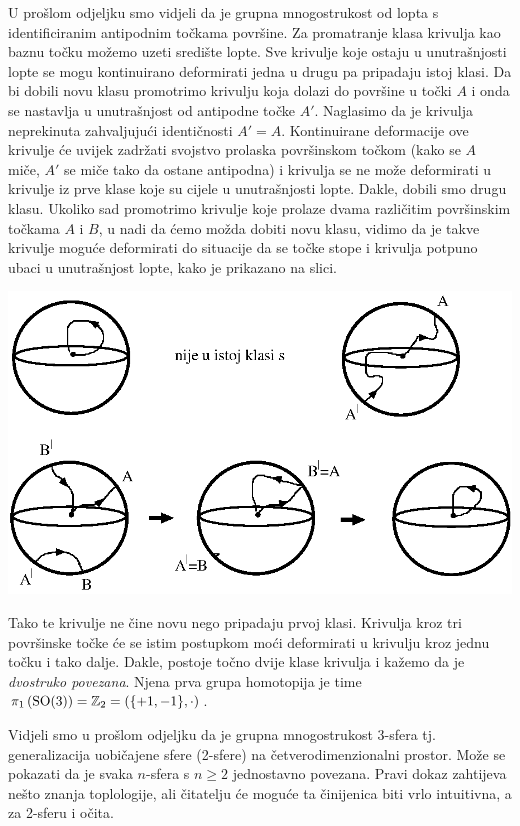 \begin{primjer}[\SO{3}]

U prošlom odjeljku smo vidjeli da je grupna mnogostrukost od 
lopta s identificiranim antipodnim točkama površine.
Za promatranje
klasa krivulja kao baznu točku možemo uzeti središte lopte. Sve krivulje
koje ostaju u unutrašnjosti lopte se mogu kontinuirano deformirati jedna
u drugu pa pripadaju istoj klasi. Da bi dobili novu klasu promotrimo
krivulju koja dolazi do površine u točki $A$ i onda se nastavlja u unutrašnjost
od antipodne točke $A'$. Naglasimo da je krivulja neprekinuta zahvaljujući
identičnosti $A'=A$.
Kontinuirane deformacije ove krivulje će uvijek
zadržati svojstvo prolaska površinskom točkom (kako se $A$ miče, $A'$ se
miče tako da ostane antipodna) i krivulja se ne može deformirati u krivulje
iz prve klase koje su cijele u unutrašnjosti lopte. Dakle, dobili smo
drugu klasu. Ukoliko sad promotrimo krivulje koje prolaze dvama različitim površinskim
točkama $A$ i $B$, u nadi da ćemo možda dobiti novu klasu, vidimo da je takve
krivulje moguće deformirati do situacije da se točke stope i krivulja potpuno
ubaci u unutrašnjost lopte, kako je prikazano na slici.

\centerline{\includegraphics[scale=0.8]{pics/dvostruka_povezanost_so3.eps}}

Tako te krivulje ne čine novu nego pripadaju prvoj klasi.
Krivulja kroz tri površinske točke će se istim postupkom moći deformirati u 
krivulju kroz jednu točku i tako dalje. Dakle, postoje točno dvije klase
krivulja i kažemo da je   \emph{dvostruko povezana}.
Njena prva grupa homotopija je time
    $\pi_1\left(\mathrm{SO}(3) \right) = \mathbb{Z}_{2} = (\{+1, -1\}, \cdot)$.
\end{primjer}

\begin{primjer}[\SU{2}]
Vidjeli smo u prošlom odjeljku da je
grupna mnogostrukost  3-sfera tj. generalizacija uobičajene
sfere (2-sfere) na četverodimenzionalni prostor. 
Može se pokazati da je svaka $n$-sfera s $n\ge 2$ jednostavno povezana.
Pravi dokaz zahtijeva nešto znanja toplologije, ali čitatelju će
moguće ta činijenica biti vrlo intuitivna, a za 2-sferu i očita.
\end{primjer}

